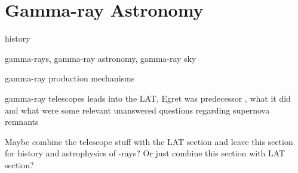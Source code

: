 \chapter{Gamma-ray Astronomy}
\label{chap:gamAstr}
history

gamma-rays, gamma-ray astronomy, gamma-ray sky

gamma-ray production mechanisms

gamma-ray telescopes leads into the LAT, Egret was  predecessor , what it did and what were some relevant unanswered questions regarding supernova remnants 
    
Maybe combine the telescope stuff  with the LAT section and leave this section for history and astrophysics of \g-rays? Or just combine this section with  LAT section?